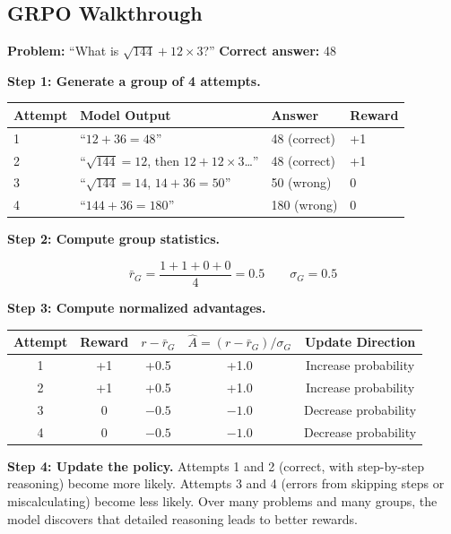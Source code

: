 \begin{chapterenv}
\subsection{GRPO Walkthrough}

\textbf{Problem:} ``What is $\sqrt{144} + 12 \times 3$?'' \quad \textbf{Correct answer:} 48

\textbf{Step 1: Generate a group of 4 attempts.}

\begin{center}
\begin{tabular}{p{}p{}p{}p{}}
\toprule
\textbf{Attempt} & \textbf{Model Output} & \textbf{Answer} & \textbf{Reward} \\
\midrule
1 & ``$12 + 36 = 48$'' & 48 (correct) & +1 \\
2 & ``$\sqrt{144} = 12$, then $12 + 12 \times 3$\ldots'' & 48 (correct) & +1 \\
3 & ``$\sqrt{144} = 14$, $14 + 36 = 50$'' & 50 (wrong) & 0 \\
4 & ``$144 + 36 = 180$'' & 180 (wrong) & 0 \\
\bottomrule
\end{tabular}
\end{center}

\textbf{Step 2: Compute group statistics.}

$$\bar{r}_G = \frac{1 + 1 + 0 + 0}{4} = 0.5 \qquad \sigma_G = 0.5$$

\textbf{Step 3: Compute normalized advantages.}

\begin{center}
\begin{tabular}{ccccc}
\toprule
\textbf{Attempt} & \textbf{Reward} & \textbf{$r - \bar{r}_G$} & \textbf{$\hat{A} = (r - \bar{r}_G)/\sigma_G$} & \textbf{Update Direction} \\
\midrule
1 & +1 & +0.5 & +1.0 & Increase probability \\
2 & +1 & +0.5 & +1.0 & Increase probability \\
3 & 0 & $-0.5$ & $-1.0$ & Decrease probability \\
4 & 0 & $-0.5$ & $-1.0$ & Decrease probability \\
\bottomrule
\end{tabular}
\end{center}

\textbf{Step 4: Update the policy.} Attempts 1 and 2 (correct, with step-by-step reasoning) become more likely. Attempts 3 and 4 (errors from skipping steps or miscalculating) become less likely. Over many problems and many groups, the model discovers that detailed reasoning leads to better rewards.


\end{chapterenv}
